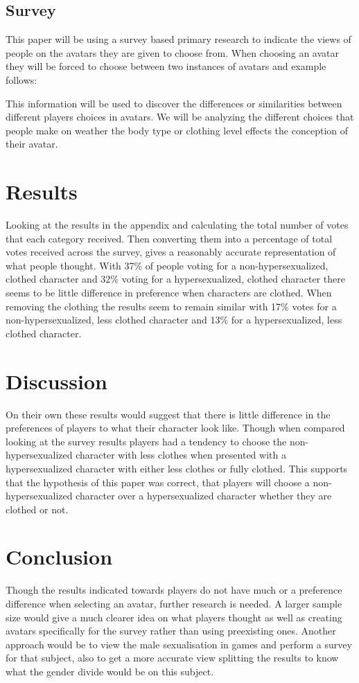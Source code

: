 \documentclass{scrartcl}
\begin{document}
\subsection{Survey}
This paper will be using a survey based primary research to indicate the views of people on the avatars they are given to choose from. When choosing an avatar they will be forced to choose between two instances of avatars and example follows:

This information will be used to discover the differences or similarities between different players choices in avatars. We will be analyzing the different choices that people make on weather the body type or clothing level effects the conception of their avatar.

\section{Results}
Looking at the results in the appendix and calculating the total number of votes that each category received. Then converting them into a percentage of total votes received across the survey, gives a reasonably accurate representation of what people thought. With 37\% of people voting for a non-hypersexualized, clothed character and 32\% voting for a hypersexualized, clothed character there seems to be little difference in preference when characters are clothed. When removing the clothing the results seem to remain similar with 17\% votes for a non-hypersexualized, less clothed character and 13\% for a hypersexualized, less clothed character.

\section{Discussion}
On their own these results would suggest that there is little difference in the preferences of players to what their character look like. Though when compared looking at the survey results players had a tendency to choose the non-hypersexualized character with less clothes when presented with a hypersexualized character with either less clothes or fully clothed. This supports that the hypothesis of this paper was correct, that players will choose a non-hypersexualized character over a hypersexualized character whether they are clothed or not.

\section{Conclusion}
Though the results indicated towards players do not have much or a preference difference when selecting an avatar, further research is needed. A larger sample size would give a much clearer idea on what players thought as well as creating avatars specifically for the survey rather than using preexisting ones. Another approach would be to view the male sexualisation in games and perform a survey for that subject, also to get a more accurate view splitting the results to know what the gender divide would be on this subject.





\end{document}
